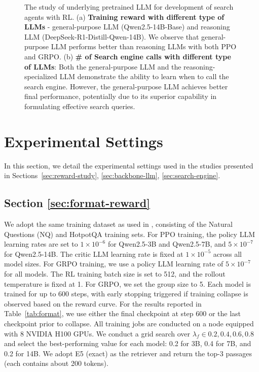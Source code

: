 \begin{figure}[h]
    \centering
    
    \hspace{0.1in}
    \caption{
The study of underlying pretrained LLM for development of search agents with RL. 
(a) \textbf{Training reward with different type of LLMs} - general-purpose LLM (Qwen2.5-14B-Base) and reasoning LLM (DeepSeek-R1-Distill-Qwen-14B). We observe that general-purpose LLM performs better than reasoning LLMs with both PPO and GRPO.
(b) \textbf{\# of Search engine calls with different type of LLMs}: Both the general-purpose LLM and the reasoning-specialized LLM demonstrate the ability to learn when to call the search engine. However, the general-purpose LLM achieves better final performance, potentially due to its superior capability in formulating effective search queries.
}\label{apx:fig:scaling-LLM}
\end{figure}

\newpage
\section{Experimental Settings}\label{apx:sec:setting}

In this section, we detail the experimental settings used in the studies presented in Sections~\ref{sec:reward-study}, \ref{sec:backbone-llm}, \ref{sec:search-engine}.

\subsection{Section \ref{sec:format-reward}}\label{apx:setting1}

We adopt the same training dataset as used in \cite{jin2025search}, consisting of the Natural Questions (NQ) and HotpotQA training sets.
For PPO training, the policy LLM learning rates are set to $1 \times 10^{-6}$ for Qwen2.5-3B and Qwen2.5-7B, and $5 \times 10^{-7}$ for Qwen2.5-14B. The critic LLM learning rate is fixed at $1 \times 10^{-5}$ across all model sizes.
For GRPO training, we use a policy LLM learning rate of $5 \times 10^{-7}$ for all models. The RL training batch size is set to 512, and the rollout temperature is fixed at 1. For GRPO, we set the group size to 5.
Each model is trained for up to 600 steps, with early stopping triggered if training collapse is observed based on the reward curve. For the results reported in Table~\ref{tab:format}, we use either the final checkpoint at step 600 or the last checkpoint prior to collapse.
All training jobs are conducted on a node equipped with 8 NVIDIA H100 GPUs.
We conduct a grid search over $\lambda_f \in {0.2, 0.4, 0.6, 0.8}$ and select the best-performing value for each model: 0.2 for 3B, 0.4 for 7B, and 0.2 for 14B.
We adopt E5 (exact) as the retriever and return the top-3 passages (each contains about 200 tokens).

